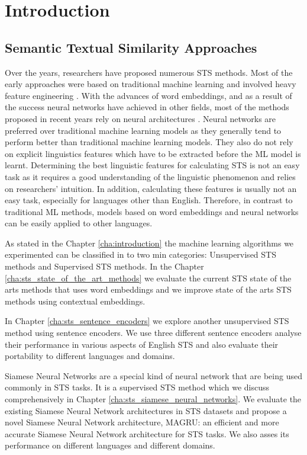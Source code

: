 \chapter{\label{cha:sts_introduction}Introduction}






\section{Semantic Textual Similarity Approaches}
Over the years, researchers have proposed numerous STS methods. Most of the early approaches were based on traditional machine learning and involved heavy feature engineering \cite{bechara-etal-2015-miniexperts}. With the advances of word embeddings, and as a result of the success neural networks have achieved in other fields, most of the methods proposed in recent years rely on neural architectures \cite{tai-etal-2015-improved,shao-2017-hcti}. Neural networks are preferred over traditional machine learning models as they generally tend to perform better than traditional machine learning models. They also do not rely on explicit linguistics features which have to be extracted before the ML model is learnt. Determining the best linguistic features for calculating STS is not an easy task as it requires a good understanding of the linguistic phenomenon and relies on researchers' intuition. In addition, calculating these features is usually not an easy task, especially for languages other than English. Therefore, in contrast to traditional ML methods, models based on word embeddings and neural networks can be easily applied to other languages.

As stated in the  Chapter \ref{cha:introduction} the machine learning algorithms we experimented can be classified in to two min categories: Unsupervised STS methods and Supervised STS methods. In the Chapter \ref{cha:sts_state_of_the_art_methods} we evaluate the current STS state of the arts methods that uses word embeddings and we improve state of the arts STS methods using contextual embeddings.

In Chapter \ref{cha:sts_sentence_encoders} we explore another unsupervised STS method using sentence encoders. We use three different sentence encoders analyse their performance in various aspects of English STS and also evaluate their portability to different languages and domains.  

Siamese Neural Networks are a special kind of neural network that are being used commonly in STS tasks. It is a supervised STS method which we discuss comprehensively in Chapter \ref{cha:sts_siamese_neural_networks}. We evaluate the existing Siamese Neural Network architectures in STS datasets and propose a novel Siamese Neural Network architecture, MAGRU: an efficient and more accurate Siamese Neural Network architecture for STS tasks. We also asses its performance on different languages and different domains. 

